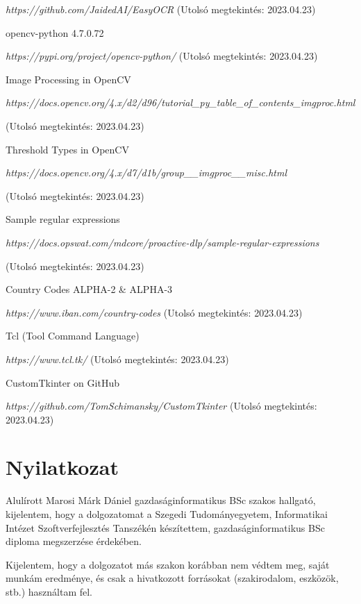 \documentclass[12pt]{report}
\begin{document}
\begin{thebibliography}{99}
\emph{https://github.com/JaidedAI/EasyOCR}
(Utolsó megtekintés: 2023.04.23)


opencv-python 4.7.0.72

\emph{https://pypi.org/project/opencv-python/}
(Utolsó megtekintés: 2023.04.23)


Image Processing in OpenCV

\emph{https://docs.opencv.org/4.x/d2/d96/tutorial\_py\_table\_of\_contents\_imgproc.html}

(Utolsó megtekintés: 2023.04.23)


Threshold Types in OpenCV

\emph{https://docs.opencv.org/4.x/d7/d1b/group\_\_imgproc\_\_misc.html}

(Utolsó megtekintés: 2023.04.23)


Sample regular expressions

\emph{https://docs.opswat.com/mdcore/proactive-dlp/sample-regular-expressions}

(Utolsó megtekintés: 2023.04.23)


Country Codes ALPHA-2 & ALPHA-3

\emph{https://www.iban.com/country-codes}
(Utolsó megtekintés: 2023.04.23)


Tcl (Tool Command Language)

\emph{https://www.tcl.tk/}
(Utolsó megtekintés: 2023.04.23)


CustomTkinter on GitHub

\emph{https://github.com/TomSchimansky/CustomTkinter}
(Utolsó megtekintés: 2023.04.23)


\end{thebibliography}


\chapter*{Nyilatkozat}

\noindent
Alulírott Marosi Márk Dániel gazdaságinformatikus BSc szakos hallgató, kijelentem, hogy a dolgozatomat a Szegedi Tudományegyetem, Informatikai Intézet Szoftverfejlesztés Tanszékén készítettem, gazdaságinformatikus BSc diploma megszerzése érdekében. \hfill \break


\noindent
Kijelentem, hogy a dolgozatot más szakon korábban nem védtem meg, saját munkám eredménye, és csak a hivatkozott forrásokat (szakirodalom, eszközök, stb.) használtam fel. \hfill \break
\end{document}
